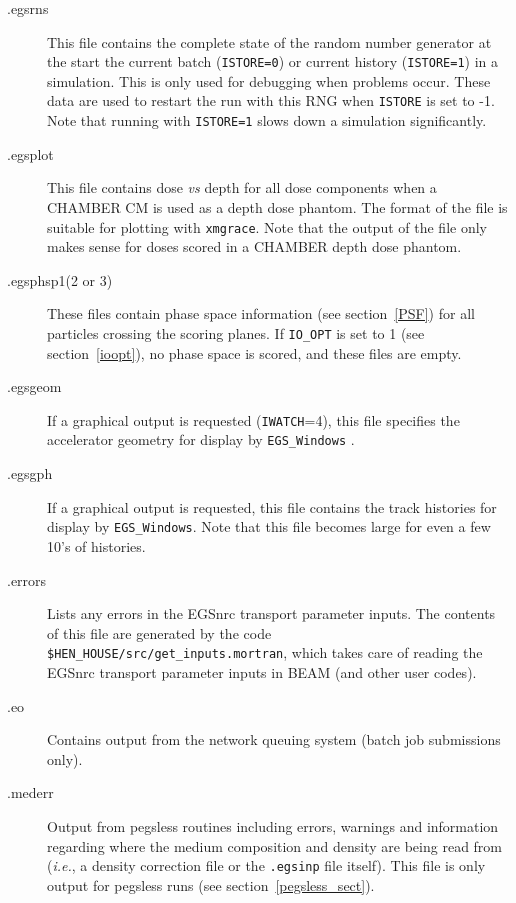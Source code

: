 \documentclass[12pt,twoside]{article}
\begin{document}
\begin{description}
\item [.egsrns]
This file contains the complete state of the random number generator
at the start the current batch
(\verb+ISTORE=0+) or current history (\verb+ISTORE=1+) in a simulation.
This is only used for debugging when problems occur.
These data are used to restart the run with this RNG
when \verb+ISTORE+ is set to -1.  Note that running with \verb+ISTORE=1+ slows
down a simulation significantly.

\item [.egsplot]
This file contains dose {\em vs} depth for all dose components when a
CHAMBER CM is used as a depth dose phantom.  The format of the file is suitable
for plotting with {\tt xmgrace}.  Note that the output
of the file only makes sense for doses scored in a CHAMBER depth dose
phantom.   

\item [.egsphsp1(2 or 3)]
These files contain phase space information (see section~\ref{PSF})
for all particles
crossing the scoring planes. If
\verb+IO_OPT+ is set to 1 (see section~\ref{ioopt}),
no phase space is scored, and these files are empty.

\item [.egsgeom]  If a graphical output is requested ({\tt IWATCH}=4), this
file specifies the accelerator geometry for display by {\tt EGS\_Windows}
\cite{TR99a}.

\item [.egsgph] If a graphical output is requested, this file contains
the track histories for display by {\tt EGS\_Windows}.  Note that this file
becomes large for even a few 10's of histories.

\item [.errors] Lists any errors in the EGSnrc transport parameter
inputs.  The contents of this file are generated by the code
{\tt \$HEN\_HOUSE/src/get\_inputs.mortran}, which takes care of reading
the EGSnrc transport parameter inputs in BEAM (and other user codes).

\item [.eo] Contains output from the network queuing system (batch job
submissions only).

\item [.mederr] Output from pegsless routines including errors, warnings and
information regarding where the medium composition and density are being read
from ({\em i.e.}, a density correction file or the {\tt .egsinp} file itself).
This file is only output for pegsless runs (see section~\ref{pegsless_sect}).

\end{description}
\end{document}

